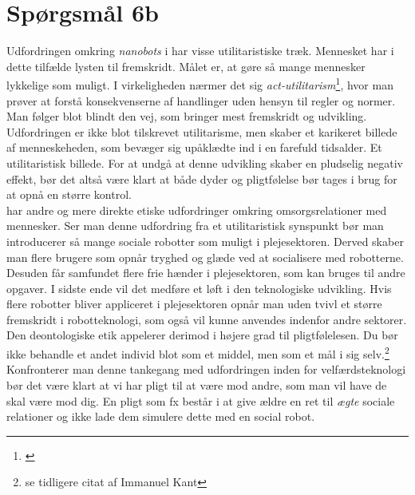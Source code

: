 \documentclass[12pt,a4paper,twoside,danish,article]{memoir}
\begin{document}
\chapter{Spørgsmål 6b}
Udfordringen omkring \textit{nanobots} i \cite{Kurzweil2004a} har visse utilitaristiske træk. Mennesket har i dette tilfælde lysten til fremskridt. Målet er, at gøre så mange mennesker lykkelige som muligt. I virkeligheden nærmer det sig \textit{act-utilitarism}\footnote{\citep[s.39]{Johnson2001a-2}}, hvor man prøver at forstå konsekvenserne af handlinger uden hensyn til regler og normer. Man følger blot blindt den vej, som bringer mest fremskridt og udvikling. Udfordringen er ikke blot tilskrevet utilitarisme, men \cite{Kurzweil2004a} skaber et karikeret billede af menneskeheden, som bevæger sig upåklædte ind i en farefuld tidsalder. Et utilitaristisk billede. For at undgå at denne udvikling skaber en pludselig negativ effekt, bør det altså være klart at både dyder og pligtfølelse bør tages i brug for at opnå en større kontrol.\\[5pt]
\cite{EtiskRaad2010a} har andre og mere direkte etiske udfordringer omkring omsorgsrelationer med mennesker. Ser man denne udfordring fra et utilitaristisk synspunkt bør man introducerer så mange sociale robotter som muligt i plejesektoren. Derved skaber man flere brugere som opnår tryghed og glæde ved at socialisere med robotterne. Desuden får samfundet flere frie hænder i plejesektoren, som kan bruges til andre opgaver. I sidste ende vil det medføre et løft i den teknologiske udvikling. Hvis flere robotter bliver appliceret i plejesektoren opnår man uden tvivl et større fremskridt i robotteknologi, som også vil kunne anvendes indenfor andre sektorer. Den deontologiske etik appelerer derimod i højere grad til pligtfølelesen. Du bør ikke behandle et andet individ blot som et middel, men som et mål i sig selv.\footnote{se tidligere citat af Immanuel Kant} Konfronterer man denne tankegang med udfordringen inden for velfærdsteknologi bør det være klart at vi har pligt til at være mod andre, som man vil have de skal være mod dig. En pligt som fx består i at give ældre en ret til \textit{ægte} sociale relationer og ikke lade dem simulere dette med en social robot.           



\backmatter
\renewcommand{\baselinestretch}{1}\normalsize %

\end{document}
